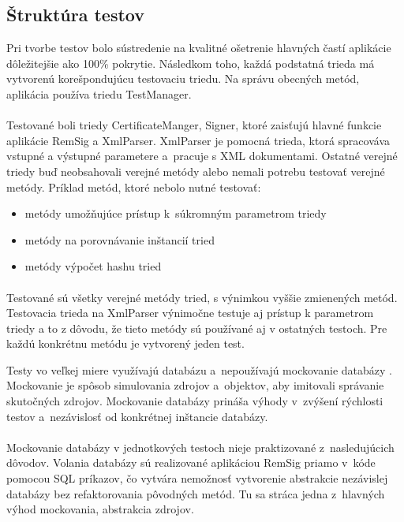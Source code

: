 \documentclass[
  digital, %
  table,   %
oneside,
  nolof,     %
  nolot,     %
]{fithesis3}
\begin{document}
\subsection{Štruktúra testov}
Pri tvorbe testov bolo sústredenie na kvalitné ošetrenie hlavných častí aplikácie dôležitejšie ako 100\% pokrytie. Následkom toho, každá podstatná trieda má vytvorenú korešpondujúcu testovaciu triedu. Na správu obecných metód, aplikácia používa triedu TestManager. \paragraph{}
Testované boli triedy CertificateManger, Signer, ktoré zaisťujú hlavné funkcie aplikácie RemSig a XmlParser. XmlParser je pomocná trieda, ktorá spracováva vstupné a výstupné parametere a~pracuje s XML dokumentami.
Ostatné verejné triedy buď neobsahovali verejné metódy alebo nemali potrebu testovať verejné metódy. Príklad metód, ktoré nebolo nutné testovať: 
\begin{itemize}	
	\item metódy umožňujúce prístup k~súkromným parametrom triedy
	\item metódy na porovnávanie inštancií tried
	\item metódy výpočet hashu tried
\end{itemize}

 \paragraph{}
Testované sú všetky verejné metódy tried, s výnimkou vyššie zmienených metód. Testovacia trieda na XmlParser výnimočne testuje aj prístup k parametrom triedy a to z dôvodu, že tieto metódy sú používané aj v ostatných testoch. Pre každú konkrétnu metódu je vytvorený jeden test. 

Testy vo veľkej miere využívajú databázu a~nepoužívajú mockovanie databázy \cite{mocking}. Mockovanie je spôsob simulovania zdrojov a~objektov, aby imitovali správanie skutočných zdrojov. Mockovanie databázy prináša výhody v~zvýšení rýchlosti testov a~nezávislosť od konkrétnej inštancie databázy. \paragraph{}

Mockovanie databázy v jednotkových testoch nieje praktizované z~nasledujúcich dôvodov. Volania databázy sú realizované aplikáciou RemSig priamo v~kóde pomocou SQL príkazov, čo vytvára nemožnosť vytvorenie abstrakcie nezávislej databázy bez refaktorovania pôvodných metód. Tu sa stráca jedna z~hlavných výhod mockovania, abstrakcia zdrojov.
\end{document}
